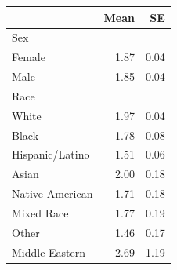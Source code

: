 
\begin{tabular}{lrr}
\toprule
 & Mean & SE\\
\midrule
Sex &  & \\
Female & 1.87 & 0.04\\
Male & 1.85 & 0.04\\
Race &  & \\
White & 1.97 & 0.04\\
\addlinespace
Black & 1.78 & 0.08\\
Hispanic/Latino & 1.51 & 0.06\\
Asian & 2.00 & 0.18\\
Native American & 1.71 & 0.18\\
Mixed Race & 1.77 & 0.19\\
\addlinespace
Other & 1.46 & 0.17\\
Middle Eastern & 2.69 & 1.19\\
\bottomrule
\end{tabular}

